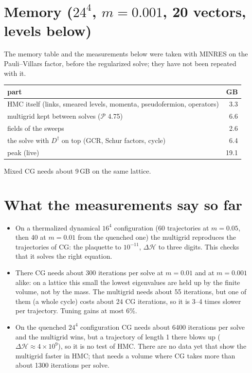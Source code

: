 \documentclass[11pt,a4paper]{article}
\numberwithin{equation}{section}
\newcommand{\dg}{^{\dagger}}
\newcommand{\Pro}{\mathcal P}
\begin{document}
\section{Memory ($24^4$, $m=0.001$, 20 vectors, levels below)}
The memory table and the measurements below were taken with MINRES on the Pauli--Villars factor,
before the regularized solve; they have not been repeated with it.
\begin{center}
\begin{tabular}{@{}lr@{}}
\toprule
part & GB\\
\midrule
HMC itself (links, smeared levels, momenta, pseudofermion, operators) & 3.3\\
multigrid kept between solves ($\Pro$ 4.75) & 6.6\\
fields of the sweeps & 2.6\\
the solve with $D\dg$ on top (GCR, Schur factors, cycle) & 6.4\\
\midrule
peak (live) & 19.1\\
\bottomrule
\end{tabular}
\end{center}
Mixed CG needs about 9\,GB on the same lattice.

\section{What the measurements say so far}
\begin{itemize}
\item On a thermalized dynamical $16^4$ configuration (60 trajectories at $m=0.05$, then 40 at
$m=0.01$ from the quenched one) the multigrid reproduces the trajectories of CG: the plaquette to
$10^{-11}$, $\Delta\mathcal H$ to three digits. This checks that it solves the right equation.
\item There CG needs about 300 iterations per solve at $m=0.01$ and at $m=0.001$ alike: on a lattice
this small the lowest eigenvalues are held up by the finite volume, not by the mass. The multigrid
needs about 55 iterations, but one of them (a whole cycle) costs about 24 CG iterations, so it is
3--4 times slower per trajectory. Tuning gains at most 6\%.
\item On the quenched $24^4$ configuration CG needs about 6400 iterations per solve and the
multigrid wins, but a trajectory of length 1 there blows up ($\Delta\mathcal H\approx4\times10^9$),
so it is no test of HMC. There are no data yet that show the multigrid faster in HMC; that needs a
volume where CG takes more than about 1300 iterations per solve.
\end{itemize}
\end{document}
